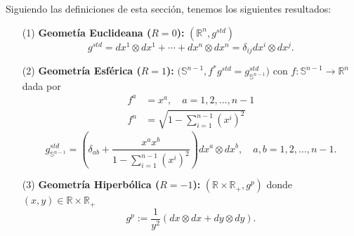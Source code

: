\begin{example}
Siguiendo las definiciones de esta secci\'on, tenemos los siguientes resultados:
\begin{enumerate}
    \item[(1)] \textbf{Geomet\'ia Euclideana ($R=0$):} $(\mathbb{R}^n,g^{std})$
    \begin{equation*}
        g^{std}=dx^1\otimes dx^1+\cdots+dx^n\otimes dx^n=\delta_{ij}dx^i\otimes dx^j.
    \end{equation*}
    \item[(2)] \textbf{Geometr\'ia Esf\'erica ($R=1$):} $\bigl(\mathbb{S}^{n-1},f^*g^{std}=g_{\mathbb{S}^{n-1}}^{std}\bigl)$ con $f\colon\mathbb{S}^{n-1}\to\mathbb{R}^n$ dada por
    \begin{align*}
        f^a&=x^a,\quad a=1,2,\dots,n-1\\
        f^n&=\sqrt{1-\sum_{i=1}^{n-1}(x^i)^2}
    \end{align*}
    \begin{equation*}
        g_{\mathbb{S}^{n-1}}^{std}=\left(\delta_{ab}+\frac{x^ax^b}{1-\sum_{i=1}^{n-1}(x^i)^2}\right)dx^a\otimes dx^b,\quad a,b=1,2,\dots,n-1. 
    \end{equation*}
    \item[(3)] \textbf{Geometr\'ia Hiperb\'olica ($R=-1$):} $(\mathbb{R}\times\mathbb{R}_+,g^p)$ donde $(x,y)\in\mathbb{R}\times\mathbb{R}_+$
    \begin{equation*}
        g^p:=\frac{1}{y^2}(dx\otimes dx+dy\otimes dy).
    \end{equation*}
\end{enumerate}    
\end{example}